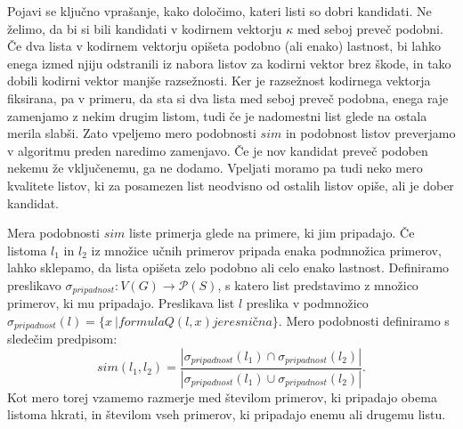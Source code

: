 \documentclass[12pt,a4paper,twoside]{article}
\theoremstyle{definition} %
\theoremstyle{plain} %
\numberwithin{equation}{section}  %
\begin{document}

Pojavi se ključno vprašanje, kako določimo, kateri listi so dobri kandidati. Ne želimo, da bi si bili kandidati v kodirnem vektorju $\kappa$ med seboj preveč podobni. 
Če dva lista v kodirnem vektorju opišeta podobno (ali enako) lastnost, bi lahko enega izmed njiju odstranili iz nabora listov za kodirni vektor brez škode, in tako dobili kodirni vektor manjše razsežnosti. 
Ker je razsežnost kodirnega vektorja fiksirana, pa v primeru, da sta si dva lista med seboj preveč podobna, enega raje zamenjamo z nekim drugim listom, tudi če je nadomestni list glede na ostala merila slabši.
Zato vpeljemo mero podobnosti $sim$ in podobnost listov preverjamo v algoritmu preden naredimo zamenjavo. Če je nov kandidat preveč podoben nekemu že vključenemu, ga ne dodamo.
Vpeljati moramo pa tudi neko mero kvalitete listov, ki za posamezen list neodvisno od ostalih listov opiše, ali je dober kandidat.

Mera podobnosti $sim$ liste primerja glede na primere, ki jim pripadajo. 
Če listoma $l_1$ in $l_2$ iz množice učnih primerov pripada enaka podmnožica primerov, lahko sklepamo, da lista opišeta zelo podobno ali celo enako lastnost.
Definiramo preslikavo $\sigma_{\mathit{pripadnost}}: V(G) \rightarrow \mathcal{P}(S)$, s katero list predstavimo z množico primerov, ki mu pripadajo.
Preslikava list $l$ preslika v podmnožico $\sigma_{\mathit{pripadnost}}(l) = \{x\ | formula Q(l,x) je resnična \}$.
Mero podobnosti definiramo s sledečim predpisom:
\[
	sim(l_1, l_2) = \frac{|\sigma_{pripadnost}(l_1) \cap \sigma_{pripadnost}(l_2)|}{|\sigma_{pripadnost}(l_1) \cup \sigma_{pripadnost}(l_2)|}.
\]
Kot mero torej vzamemo razmerje med številom primerov, ki pripadajo obema listoma hkrati, in številom vseh primerov, ki pripadajo enemu ali drugemu listu.
\end{document}
